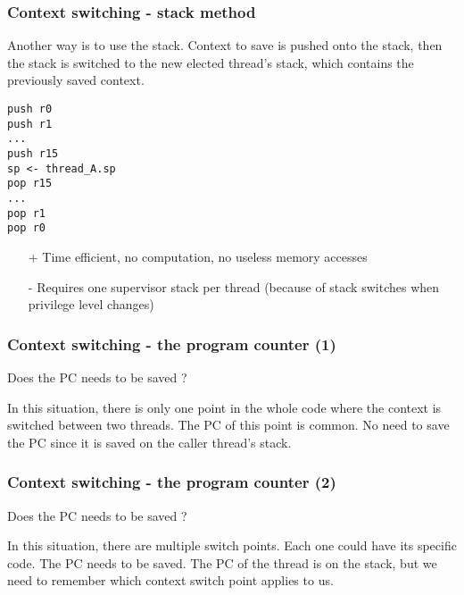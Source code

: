 
\begin{frame}[containsverbatim]
  \frametitle{Context switching - stack method}

  Another way is to use the stack. Context to save is pushed onto the
  stack, then the stack is switched to the new elected thread's stack,
  which contains the previously saved context.

  \begin{verbatim}
push r0
push r1
...
push r15
sp <- thread_A.sp
pop r15
...
pop r1
pop r0
  \end{verbatim}

  \begin{itemize}
  \item[+]
    Time efficient, no computation, no useless memory accesses
  \item[-]
    Requires one supervisor stack per thread (because of stack
    switches when privilege level changes)
  \end{itemize}

\end{frame}


\begin{frame}[containsverbatim]
  \frametitle{Context switching - the program counter (1)}

  Does the PC needs to be saved ?

  \begin{center}
  \end{center}

  In this situation, there is only one point in the whole code where
  the context is switched between two threads. The PC of this point is
  common. No need to save the PC since it is saved on the caller
  thread's stack.

\end{frame}


\begin{frame}[containsverbatim]
  \frametitle{Context switching - the program counter (2)}

  Does the PC needs to be saved ?

  \begin{center}
  \end{center}

  In this situation, there are multiple switch points. Each one could
  have its specific code. The PC needs to be saved. The PC of the
  thread is on the stack, but we need to remember which context switch
  point applies to us.

\end{frame}

